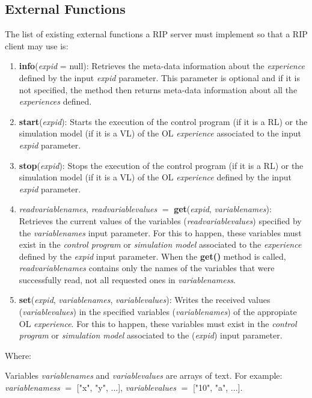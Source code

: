 \subsection{External Functions}
\label{sec:External_Functions}
The list of existing external functions a RIP server must implement so that a RIP client may use is:

\begin{enumerate}
    \item \textbf{info}(\textit{expid} = null): Retrieves the meta-data information about the \textit{experience} defined by the input \textit{expid} parameter.  This parameter is optional and if it is not specified, the method then returns meta-data information about all the \textit{experiences} defined.
    \item \textbf{start}(\textit{expid}): Starts the execution of the control program (if it is a RL) or the simulation model (if it is a VL) of the OL \textit{experience} associated to the input \textit{expid} parameter.
    \item \textbf{stop}(\textit{expid}): Stops the execution of the control program (if it is a RL) or the simulation model (if it is a VL) of the OL \textit{experience} defined by the input \textit{expid} parameter.
    \item \textit{readvariablenames}, \textit{readvariablevalues} $=$ \textbf{get}(\textit{expid}, \textit{variablenames}): Retrieves the current values of the variables (\textit{readvariablevalues}) specified by the \textit{variablenames} input parameter. For this to happen, these variables must exist in the \textit{control program} or \textit{simulation model} associated to the \textit{experience} defined by the \textit{expid} input parameter. When the \textbf{get()} method is called, \textit{readvariablenames} contains only the names of the variables that were successfully read, not all requested ones in \textit{variablenamess}.
    \item \textbf{set}(\textit{expid}, \textit{variablenames}, \textit{variablevalues}): Writes the received values (\textit{variablevalues}) in the specified variables (\textit{variablenames}) of the appropiate OL \textit{experience}. For this to happen, these variables must exist in the \textit{control program} or \textit{simulation model} associated to the (\textit{expid}) input parameter.
\end{enumerate}

Where:

Variables \textit{variablenames} and \textit{variablevalues} are arrays of text. For example: \textit{variablenamess} $=$ ["x", "y", ...], \textit{variablevalues} $=$ ["10", "a", ...].


